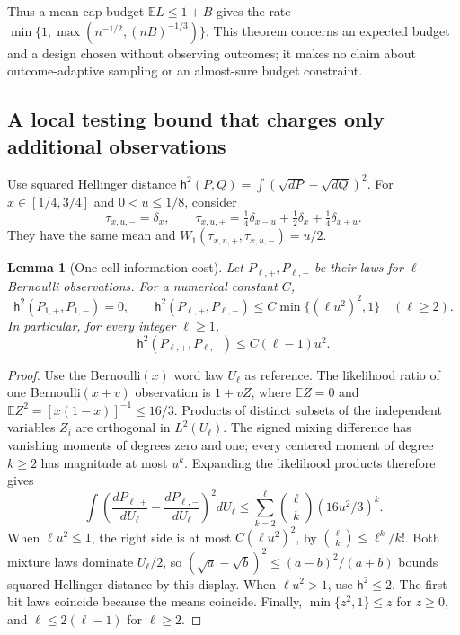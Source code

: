 \documentclass[11pt,a4paper]{article}
\newtheorem{lemma}[theorem]{Lemma}
\theoremstyle{definition}\newtheorem{definition}[theorem]{Definition}
\theoremstyle{remark}\newtheorem{remark}[theorem]{Remark}
\newcommand{\E}{\mathbb E}\newcommand{\one}{\mathbf 1}\newcommand{\1}{\mathbf 1}
\numberwithin{equation}{section}
\begin{document}
Thus a mean cap budget $\E L\le1+B$ gives the rate
$\min\{1,\max(n^{-1/2},(nB)^{-1/3})\}$. This theorem concerns an expected
budget and a design chosen without observing outcomes; it makes no claim
about outcome-adaptive sampling or an almost-sure budget constraint.

\subsection{A local testing bound that charges only additional observations}

Use squared Hellinger distance
$\mathsf h^2(P,Q)=\int(\sqrt{dP}-\sqrt{dQ})^2$. For
$x\in[1/4,3/4]$ and $0<u\le1/8$, consider
\[
 \tau_{x,u,-}=\delta_x,
 \qquad
 \tau_{x,u,+}=\tfrac14\delta_{x-u}
                 +\tfrac12\delta_x+\tfrac14\delta_{x+u}.
\]
They have the same mean and $W_1(\tau_{x,u,+},\tau_{x,u,-})=u/2$.

\begin{lemma}[One-cell information cost]
\label{ext-meiji-cell}
Let $P_{\ell,+},P_{\ell,-}$ be their laws for $\ell$ Bernoulli observations.
For a numerical constant $C$,
\[
 \mathsf h^2(P_{1,+},P_{1,-})=0,
 \qquad
 \mathsf h^2(P_{\ell,+},P_{\ell,-})
 \le C\min\{(\ell u^2)^2,1\}\quad(\ell\ge2).
\]
In particular, for every integer $\ell\ge1$,
\[
 \mathsf h^2(P_{\ell,+},P_{\ell,-})
 \le C(\ell-1)u^2.
\]
\end{lemma}
\begin{proof}
Use the Bernoulli$(x)$ word law $U_\ell$ as reference. The likelihood ratio
of one Bernoulli$(x+v)$ observation is $1+vZ$, where $\E Z=0$ and
$\E Z^2=[x(1-x)]^{-1}\le16/3$. Products of distinct subsets of the
independent variables $Z_i$ are orthogonal in $L^2(U_\ell)$. The signed
mixing difference has vanishing moments of degrees zero and one; every
centered moment of degree $k\ge2$ has magnitude at most $u^k$. Expanding
the likelihood products therefore gives
\[
 \int\left(\frac{dP_{\ell,+}}{dU_\ell}
            -\frac{dP_{\ell,-}}{dU_\ell}\right)^2dU_\ell
 \le\sum_{k=2}^{\ell}\binom{\ell}{k}(16u^2/3)^k.
\]
When $\ell u^2\le1$, the right side is at most $C(\ell u^2)^2$, by
$\binom{\ell}{k}\le\ell^k/k!$. Both mixture laws dominate
$U_\ell/2$, so
$(\sqrt a-\sqrt b)^2\le(a-b)^2/(a+b)$ bounds squared Hellinger distance
by this display. When $\ell u^2>1$, use $\mathsf h^2\le2$. The first-bit
laws coincide because the means coincide. Finally,
$\min\{z^2,1\}\le z$ for $z\ge0$, and
$\ell\le2(\ell-1)$ for $\ell\ge2$.
\end{proof}
\end{document}
